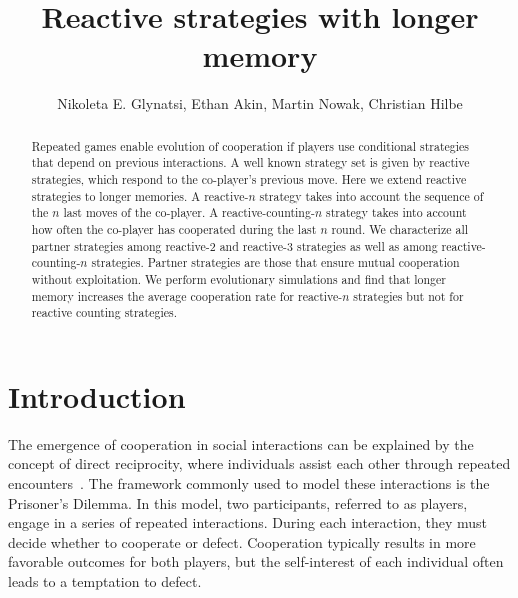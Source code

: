 \documentclass{article}
\title{Reactive strategies with longer memory}
\author{Nikoleta E. Glynatsi, Ethan Akin, Martin Nowak, Christian Hilbe}
\date{}
\theoremstyle{definition}
\begin{document}
\maketitle

\begin{abstract}

Repeated games enable evolution of cooperation if players use conditional
strategies that depend on previous interactions. A well known strategy set is
given by reactive strategies, which respond to the co-player's previous move.
Here we extend reactive strategies to longer memories. A reactive-$n$ strategy
takes into account the sequence of the $n$ last moves of the co-player. A
reactive-counting-$n$ strategy takes into account how often the co-player has
cooperated during the last $n$ round. We characterize all partner strategies among
reactive-2 and reactive-3 strategies as well as among reactive-counting-$n$
strategies. Partner strategies are those that ensure mutual cooperation without
exploitation. We perform evolutionary simulations and find that longer memory
increases the average cooperation rate for reactive-$n$ strategies but not for
reactive counting strategies.

\end{abstract}

\section{Introduction}

The emergence of cooperation in social interactions can be explained by the
concept of direct reciprocity, where individuals assist each other through
repeated encounters~\cite{axelrod:AAAS:1981, nowak:Science:2006, sigmund2010}.
The framework commonly used to model these interactions is the Prisoner's
Dilemma. In this model, two participants, referred to as players, engage in a
series of repeated interactions. During each interaction, they must decide
whether to cooperate or defect. Cooperation typically results in more favorable
outcomes for both players, but the self-interest of each individual often leads
to a temptation to defect.
\end{document}
